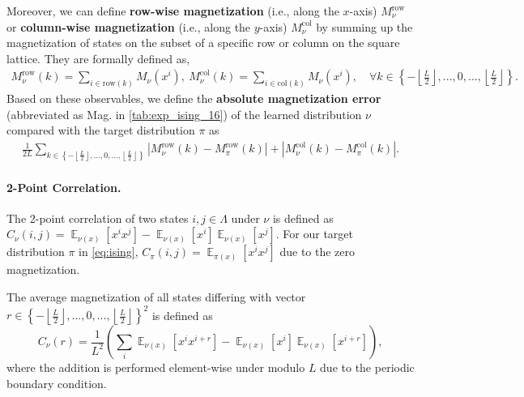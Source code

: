 \documentclass{article}
\theoremstyle{remark}
\newcommand{\ro}[1]{\left(#1\right)} %
\newcommand{\cu}[1]{\left\{#1\right\}} %
\newcommand{\abs}[1]{\left|#1\right|}
\newcommand{\floor}[1]{\left\lfloor#1\right\rfloor}
\newcommand{\E}{\operatorname{\mathbb{E}}}
\begin{document}
Moreover, we can define \textbf{row-wise magnetization} (i.e., along the $x$-axis) $M^{\mathrm{row}}_{\nu}$ or \textbf{column-wise magnetization} (i.e., along the $y$-axis) $M^{\mathrm{col}}_{\nu}$ by summing up the magnetization of states on the subset of a specific row or column on the square lattice. They are formally defined as,
\begin{align}
\label{eq:ising_row_col_mag}
    M^{\mathrm{row}}_{\nu}(k) = \sum_{i \in \mathrm{row}(k)} M_{\nu}(x^i),~ M^{\mathrm{col}}_{\nu}(k) = \sum_{i \in \mathrm{col}(k)} M_{\nu}(x^i), \quad \forall  k \in \cu{-\floor{\frac{L}{2}},...,0,...,\floor{\frac{L}{2}}}.
\end{align}
Based on these observables, we define the \textbf{absolute magnetization error} (abbreviated as Mag. in \cref{tab:exp_ising_16}) of the learned distribution $\nu$ compared with the target distribution $\pi$ as
\begin{align}
    \label{eq:ising_mag_err_def}
   \frac{1}{2L} \sum_{k \in \cu{-\floor{\frac{L}{2}},...,0,...,\floor{\frac{L}{2}}}} \abs{ M^{\mathrm{row}}_{\nu}(k) - M^{\mathrm{row}}_{\pi}(k)} + \abs{ M^{\mathrm{col}}_{\nu}(k) - M^{\mathrm{col}}_{\pi}(k)}.
\end{align}

\paragraph{2-Point Correlation.} The 2-point correlation of two states $i,j\in\Lambda$ under $\nu$ is defined as $C_\nu(i,j)=\E_{\nu(x)}[x^ix^j]-\E_{\nu(x)}[x^i]\E_{\nu(x)}[x^j]$. For our target distribution $\pi$ in \cref{eq:ising}, $C_\pi(i,j)=\E_{\pi(x)}[x^ix^j]$ due to the zero magnetization.

The average magnetization of all states differing with vector $r\in\cu{-\floor{\frac{L}{2}},...,0,...,\floor{\frac{L}{2}}}^2$ is defined as 
$$C_\nu(r)=\frac{1}{L^2}\ro{\sum_i\E_{\nu(x)}[x^ix^{i+r}]-\E_{\nu(x)}[x^i]\E_{\nu(x)}[x^{i+r}]},$$
where the addition is performed element-wise under modulo $L$ due to the periodic boundary condition. %
\end{document}
